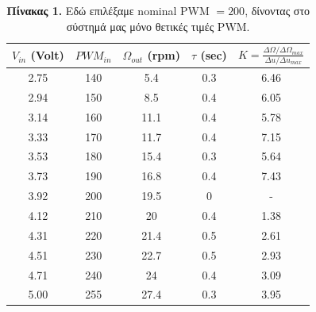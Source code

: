 \documentclass{article}
\begin{document}
    \begin{table}[!h]
        \centering
        \begin{tabular}{|c|c|c|c|c|}
        \hline
            \(V_{in}\) (Volt) & \(PWM_{in}\) & \(\Omega_{out}\) (rpm) & \(\tau\) (sec) & \(Κ = \frac{\Delta\Omega/\Delta\Omega_{max}}{\Delta u/{\Delta u}_{max}}\)\\ \hline
            2.75 & 140 &  5.4 & 0.3 & 6.46\\ \hline
            2.94 & 150 &  8.5 & 0.4 & 6.05\\ \hline
            3.14 & 160 & 11.1 & 0.4 & 5.78\\ \hline
            3.33 & 170 & 11.7 & 0.4 & 7.15\\ \hline
            3.53 & 180 & 15.4 & 0.3 & 5.64\\ \hline
            3.73 & 190 & 16.8 & 0.4 & 7.43\\ \hline
            3.92 & 200 & 19.5 &   0 & -   \\ \hline
            4.12 & 210 &   20 & 0.4 & 1.38\\ \hline
            4.31 & 220 & 21.4 & 0.5 & 2.61\\ \hline
            4.51 & 230 & 22.7 & 0.5 & 2.93\\ \hline
            4.71 & 240 &   24 & 0.4 & 3.09\\ \hline
            5.00 & 255 & 27.4 & 0.3 & 3.95\\ \hline
        \end{tabular}
        \caption{\textbf{Πίνακας 1.} Εδώ επιλέξαμε nominal PWM \(= 200\), δίνοντας στο σύστημά μας μόνο θετικές τιμές PWM.}
    \end{table}
\end{document}
